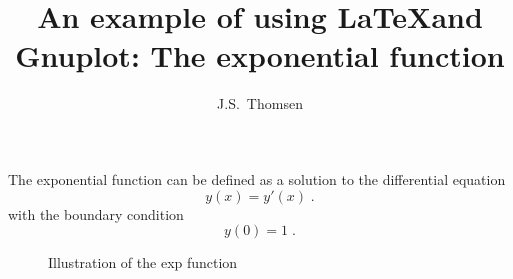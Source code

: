 \documentclass[twocolumn]{article}
\title{An example of using \LaTeX and Gnuplot: The exponential function}
\author{J.S.~Thomsen}
\begin{document}
\maketitle
The exponential function can be defined as a solution to the differential equation
\begin{equation}\label{diff-eq}
	y(x) = y'(x) \;.
\end{equation}
with the boundary condition
\begin{equation}\label{bound-cond}
	y(0) = 1 \;.
\end{equation}

\begin{figure}[h]
	
	\caption{Illustration of the exp function}
\end{figure}
\end{document}
